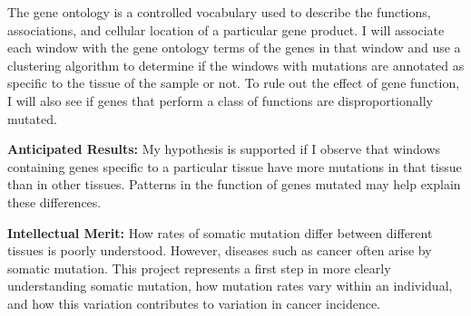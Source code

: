 \documentclass[12pt]{article}
\begin{document}
The gene ontology is a controlled vocabulary used to describe the functions, associations, and cellular location of a particular gene product. I will associate each window with the gene ontology terms of the genes in that window and use a clustering algorithm to determine if the windows with mutations are annotated as specific to the tissue of the sample or not.%
To rule out the effect of gene function, I will also see if genes that perform a class of functions are disproportionally mutated.


\textbf{Anticipated Results:}
My hypothesis is supported if I observe that windows containing genes specific to a particular tissue have more mutations in that tissue than in other tissues. Patterns in the function of genes mutated may help explain these differences.

\textbf{Intellectual Merit:}
How rates of somatic mutation differ between different tissues is poorly understood. However, diseases such as cancer often arise by somatic mutation.
This project represents a first step in more clearly understanding somatic mutation, how mutation rates vary within an individual, and how this variation contributes to variation in cancer incidence.
\end{document}
